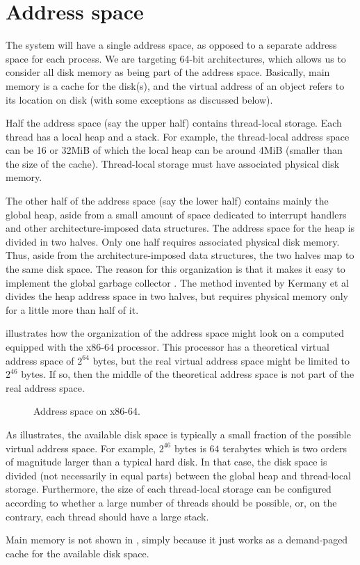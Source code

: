 \chapter{Address space}

The system will have a single address space, as opposed to a separate
address space for each process.  We are targeting 64-bit
architectures, which allows us to consider all disk memory as being
part of the address space.  Basically, main memory is a cache for the
disk(s), and the virtual address of an object refers to its location
on disk (with some exceptions as discussed below).

Half the address space (say the upper half) contains thread-local
storage.  Each thread has a local heap and a stack.  For example, the
thread-local address space can be 16 or 32MiB of which the local heap
can be around 4MiB (smaller than the size of the cache).  Thread-local
storage must have associated physical disk memory. 

The other half of the address space (say the lower half) contains
mainly the global heap, aside from a small amount of space dedicated
to interrupt handlers and other architecture-imposed data structures.
The address space for the heap is divided in two halves.  Only one
half requires associated physical disk memory.  Thus, aside from the
architecture-imposed data structures, the two halves map to the same
disk space.  The reason for this organization is that it makes it easy
to implement the global garbage collector
.  The method invented by Kermany et
al \cite{Kermany:2006:CCI:1133981.1134023} divides the heap address
space in two halves, but requires physical memory only for a little
more than half of it.

 illustrates how the organization of the
address space might look on a computed equipped with the x86-64
processor.  This processor has a theoretical virtual address space of
$2^{64}$ bytes, but the real virtual address space might be limited
to $2^{46}$ bytes.  If so, then the middle of the theoretical address
space is not part of the real address space. 

\begin{figure}
\begin{center}
\end{center}
\caption{\label{fig-address-space}
Address space on x86-64.}
\end{figure}

As  illustrates, the available disk space is
typically a small fraction of the possible virtual address space.  For
example, $2^{46}$ bytes is $64$ terabytes which is two orders of
magnitude larger than a typical hard disk.  In that case, the disk
space is divided (not necessarily in equal parts) between the global
heap and thread-local storage.  Furthermore, the size of each
thread-local storage can be configured according to whether a large
number of threads should be possible, or, on the contrary, each thread
should have a large stack.  

Main memory is not shown in , simply because
it just works as a demand-paged cache for the available disk space. 
